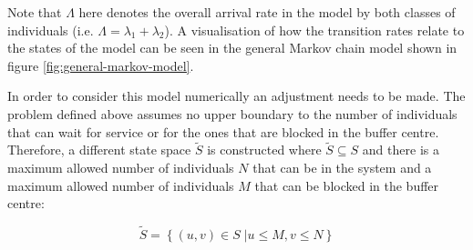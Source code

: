 Note that \(\Lambda\) here denotes the overall arrival rate in the model by both 
classes of individuals (i.e. \(\Lambda = \lambda_1 + \lambda_2\)). 
A visualisation of how the transition rates relate to the states of the model 
can be seen in the general Markov chain model shown in figure 
\ref{fig:general-markov-model}.




In order to consider this model numerically an adjustment needs to be made. 
The problem defined above assumes no upper boundary to the number of individuals 
that can wait for service or for the ones that are blocked in the buffer centre. 
Therefore, a different state space \( \tilde S \) is constructed where 
\( \tilde S \subseteq S \) and there is a maximum allowed number of individuals 
\(N\) that can be in the system and a maximum allowed number of individuals 
\(M\) that can be blocked in the buffer centre:

\begin{equation}
    \tilde S = \left\{ (u, v) \in S\;| u \leq M, v\leq N \right\}
\end{equation}






